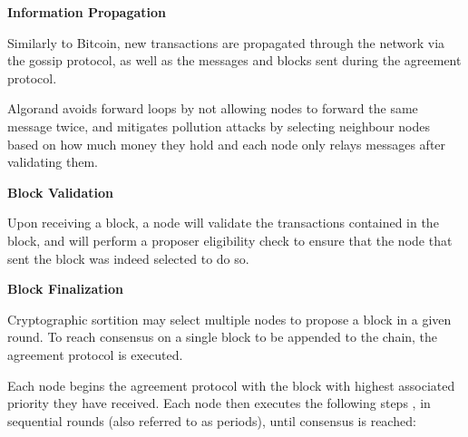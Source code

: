 \vspace{0.25cm}


\textbf{Information Propagation}

Similarly to Bitcoin, new transactions are propagated through the network via the gossip protocol, as well as the messages and blocks sent during the agreement protocol.

Algorand avoids forward loops by not allowing nodes to forward the same message twice, and mitigates pollution attacks by selecting neighbour nodes based on how much money they hold and each node only relays messages after validating them.


\vspace{0.25cm}

\textbf{Block Validation}

Upon receiving a block, a node will validate the transactions contained in the block, and will perform a proposer eligibility check to ensure that the node that sent the block was indeed selected to do so.

\vspace{0.25cm}

\textbf{Block Finalization}

Cryptographic sortition may select multiple nodes to propose a block in a given round. To reach consensus on a single block to be appended to the chain, the agreement protocol is executed.

Each node begins the agreement protocol with the block with highest associated priority they have received. Each node then executes the following steps \cite{algorand_agreement}, in sequential rounds (also referred to as periods), until consensus is reached:

